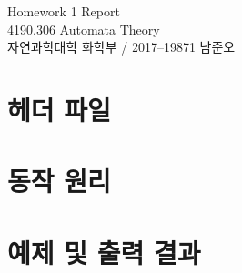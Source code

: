 \documentclass{article}
\begin{document}
\begin{center}
	\Huge \textsf{Homework 1 Report}\\
	\Large \textsf{4190.306 Automata Theory}\\ \vspace{0.25cm}
	\large \textsf{자연과학대학 화학부 / 2017--19871 남준오}\\
	\normalsize
	\vspace{0.5cm}
\end{center}

\begin{multicols}{2}

\section{헤더 파일}

\section{동작 원리}

\section{예제 및 출력 결과}


\end{multicols}
\end{document}
